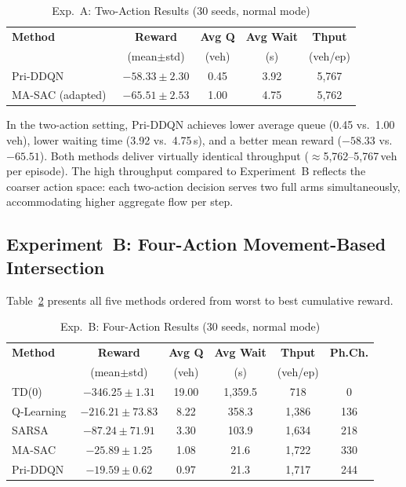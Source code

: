 \documentclass[conference]{IEEEtran}
\begin{document}
\begin{table}[h]
\centering
\caption{Exp.~A: Two-Action Results (30 seeds, normal mode)}
\label{tab:2action}
\setlength{\tabcolsep}{4pt}
\begin{tabular}{lcccc}
\toprule
\textbf{Method} & \textbf{Reward} & \textbf{Avg Q} & \textbf{Avg Wait} & \textbf{Thput}\\
 & (mean$\pm$std) & (veh) & (s) & (veh/ep) \\
\midrule
Pri-DDQN~\cite{Zheng2024PriDDQNLAG}
  & $-58.33 \pm 2.30$ & 0.45 & 3.92 & 5{,}767 \\
MA-SAC (adapted)~\cite{Wang2024TowardMRP}
  & $-65.51 \pm 2.53$ & 1.00 & 4.75 & 5{,}762 \\
\bottomrule
\end{tabular}
\end{table}

In the two-action setting, Pri-DDQN achieves lower average queue
(0.45 vs.\ 1.00\,veh), lower waiting time (3.92 vs.\ 4.75\,s), and
a better mean reward ($-58.33$ vs.\ $-65.51$). Both methods
deliver virtually identical throughput ($\approx$5{,}762--5{,}767\,veh
per episode). The high throughput compared to Experiment~B reflects
the coarser action space: each two-action decision serves two full
arms simultaneously, accommodating higher aggregate flow per step.

\subsection{Experiment~B: Four-Action Movement-Based Intersection}

Table~\ref{tab:4action} presents all five methods ordered from
worst to best cumulative reward.

\begin{table}[h]
\centering
\caption{Exp.~B: Four-Action Results (30 seeds, normal mode)}
\label{tab:4action}
\setlength{\tabcolsep}{3pt}
\begin{tabular}{lccccc}
\toprule
\textbf{Method} & \textbf{Reward} & \textbf{Avg Q} & \textbf{Avg Wait} & \textbf{Thput} & \textbf{Ph.Ch.}\\
 & (mean$\pm$std) & (veh) & (s) & (veh/ep) & \\
\midrule
TD(0)
  & $-346.25\pm1.31$ & 19.00 & 1{,}359.5 & 718   & 0   \\
Q-Learning
  & $-216.21\pm73.83$ & 8.22 & 358.3    & 1{,}386 & 136 \\
SARSA
  & $-87.24\pm71.91$  & 3.30 & 103.9    & 1{,}634 & 218 \\
MA-SAC~\cite{Wang2024TowardMRP}
  & $-25.89\pm1.25$   & 1.08 & 21.6     & 1{,}722 & 330 \\
Pri-DDQN~\cite{Zheng2024PriDDQNLAG}
  & $-19.59\pm0.62$   & 0.97 & 21.3     & 1{,}717 & 244 \\
\bottomrule
\end{tabular}
\end{table}
\end{document}
